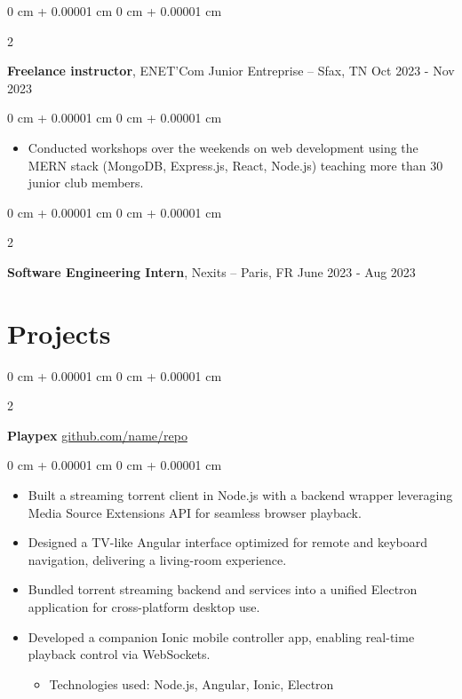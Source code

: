 \documentclass[10pt, letterpaper]{article}
\newenvironment{highlights}{
  \begin{itemize}[
    topsep=0.10 cm,
    parsep=0.10 cm,
    partopsep=0pt,
    itemsep=0pt,
    leftmargin=0 cm + 10pt
    ]
  }{
\end{itemize}
} %
\newenvironment{highlightsforbulletentries}{
  \begin{itemize}[
    topsep=0.10 cm,
    parsep=0.10 cm,
    partopsep=0pt,
    itemsep=0pt,
    leftmargin=10pt
    ]
  }{
\end{itemize}
} %
\newenvironment{onecolentry}{
  \begin{adjustwidth}{
      0 cm + 0.00001 cm
    }{
      0 cm + 0.00001 cm
    }
  }{
  \end{adjustwidth}
} %
\newenvironment{twocolentry}[2][]{
  \onecolentry
  \def\secondColumn{#2}
  \setcolumnwidth{\fill, 4.5 cm}
  \begin{paracol}{2}
  }{
    \switchcolumn \raggedleft \secondColumn
  \end{paracol}
  \endonecolentry
} %
\begin{document}
    \begin{twocolentry}{
      Oct 2023 - Nov 2023
    }
  \textbf{Freelance instructor}, ENET’Com Junior Entreprise  -- Sfax, TN\end{twocolentry}

  \vspace{0.10 cm}
  \begin{onecolentry}
    \begin{highlights}

    \item Conducted workshops over the weekends on web development using the MERN stack (MongoDB, Express.js, React, Node.js) teaching more than 30 junior club members.


    \end{highlights}

  \end{onecolentry}





  \begin{twocolentry}{
      June 2023 - Aug 2023
    }
  \textbf{Software Engineering Intern}, Nexits  -- Paris, FR\end{twocolentry}

  \vspace{0.10 cm}

  \section{Projects}


  \vspace{0.2 cm}

  \begin{twocolentry}{
      \href{https://github.com/sinaatalay/rendercv}{github.com/name/repo}
    }
  \textbf{Playpex}\end{twocolentry}

  \vspace{0.10 cm}
  \begin{onecolentry}
    \begin{highlights}
\item Built a streaming torrent client in Node.js with a backend wrapper leveraging Media Source Extensions API for seamless browser playback.
\item Designed a TV-like Angular interface optimized for remote and keyboard navigation, delivering a living-room experience.
\item Bundled torrent streaming backend and services into a unified Electron application for cross-platform desktop use.
\item Developed a companion Ionic mobile controller app, enabling real-time playback control via WebSockets.

                \begin{highlightsforbulletentries}
    \item Technologies used: Node.js, Angular, Ionic, Electron
    \end{highlightsforbulletentries}

    \end{highlights}
  \end{onecolentry}
\end{document}

